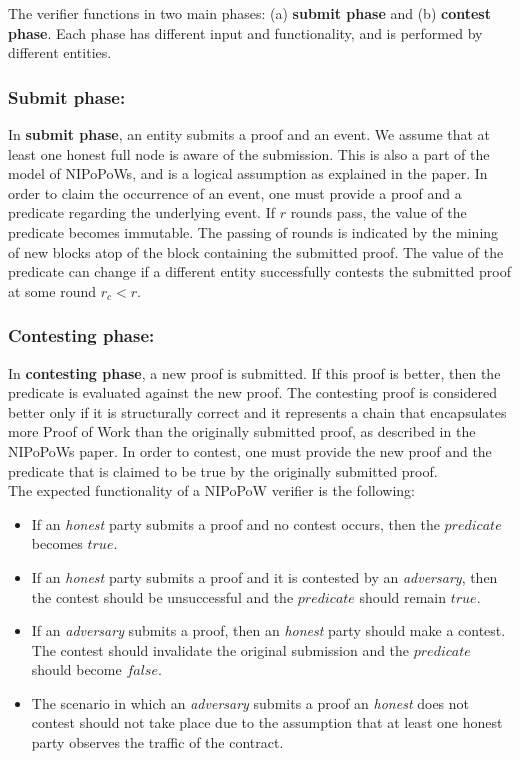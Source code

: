 The verifier functions in two main phases: (a) \textbf{submit phase} and (b)
\textbf{contest phase}. Each phase has different input and functionality, and
is performed by different entities.

\subsubsection{Submit phase:} In \textbf{submit phase}, an entity submits a proof
and an event. We assume that at least one honest full node is aware of the
submission. This is also a part of the model of NIPoPoWs, and is a logical
assumption as explained in the paper. In order to claim the occurrence of an
event, one must provide a proof and a predicate regarding the underlying event.
If $r$ rounds pass, the value of the predicate becomes immutable. The passing
of rounds is indicated by the mining of new blocks atop of the block containing
the submitted proof. The value of the predicate can change if a different entity
successfully contests the submitted proof at some round $r_{c} < r$.

\subsubsection{Contesting phase:} In \textbf{contesting phase}, a new proof is
submitted. If this proof is better, then the predicate is evaluated against the
new proof. The contesting proof is considered better only if it is structurally
correct and it represents a chain that encapsulates more Proof of Work than the
originally submitted proof, as described in the NIPoPoWs paper.  In order to
contest, one must provide the new proof and the predicate that is claimed to be
true by the originally submitted proof.\\

The expected functionality of a NIPoPoW verifier is the following:
\begin{itemize}

    \item
        If an \textit{honest} party submits a proof and no contest occurs, then
        the $predicate$ becomes $true$.

    \item
        If an \textit{honest} party submits a proof and it is contested by an
        \textit{adversary}, then the contest should be unsuccessful and the
        $predicate$ should remain $true$.

    \item
        If an \textit{adversary} submits a proof, then an \textit{honest} party
        should make a contest. The contest should invalidate the original
        submission and the $predicate$ should become $false$.

    \item
        The scenario in which an \textit{adversary} submits a proof an
        \textit{honest} does not contest should not take place due to the
        assumption that at least one honest party observes the traffic of the
        contract.

\end{itemize}

